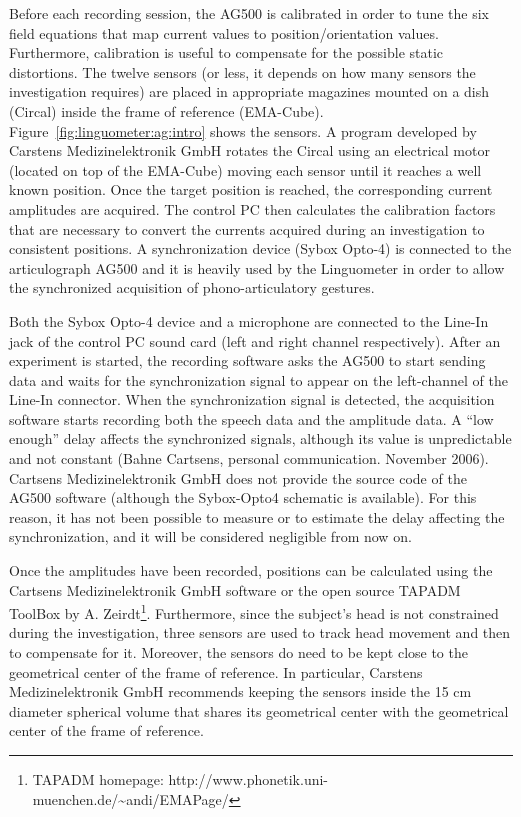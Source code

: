 Before each recording session, the AG500 is calibrated in order to
tune the six field equations that map current values to position/orientation
values.
Furthermore, calibration is useful to compensate for the possible static
distortions. 
The twelve sensors (or less, it depends on how many sensors the investigation 
requires) are placed in appropriate magazines mounted on a dish (Circal) inside
the  frame of reference (EMA-Cube).
Figure~\ref{fig:linguometer:ag:intro} shows the sensors.
A program developed by Carstens Medizinelektronik GmbH rotates the Circal using an
electrical motor (located on top of the EMA-Cube) moving each sensor until it 
reaches a well known position.
Once the target position is reached, the corresponding current amplitudes  
are acquired. The control PC then calculates the calibration factors that are
necessary to convert the currents acquired during an
investigation to consistent positions.
A synchronization device (Sybox Opto-4) is connected to the articulograph
AG500 and
it is heavily used by the Linguometer in order to allow the synchronized 
acquisition of phono-articulatory gestures.

Both the Sybox Opto-4 device and a microphone are connected to the Line-In jack
of the control PC sound card (left and right channel respectively).
After an experiment is started, the recording software asks the AG500 to
start sending data and waits for the synchronization signal to appear on the
left-channel of the Line-In connector.
When the synchronization signal is detected, the acquisition software starts
recording both the speech data and the amplitude data.
A ``low enough'' delay affects the synchronized signals, although its value is
unpredictable and not constant (Bahne Cartsens, personal  communication. 
November 2006).
Cartsens Medizinelektronik GmbH does not provide the source code of the AG500
software (although the Sybox-Opto4 schematic is available).
For this reason, it has not been possible to measure or to estimate the delay
affecting the synchronization, and it will be considered negligible from now on.


Once the amplitudes have been recorded, positions can be calculated using the
Cartsens Medizinelektronik GmbH software or the open source TAPADM ToolBox by A.
Zeirdt\footnote{TAPADM homepage:
http://www.phonetik.uni-muenchen.de/\~{}andi/EMAPage/}.
Furthermore, since the subject's head is not constrained during the
investigation, three sensors are used to track head movement and then to
compensate for it.
Moreover, the sensors do need to be kept close to the geometrical center of the
frame of reference.
In particular, Carstens Medizinelektronik GmbH recommends keeping the sensors
inside the 15 cm diameter spherical volume that shares its geometrical center 
with the geometrical center of the frame of reference.

